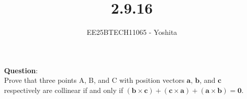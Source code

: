 \documentclass[journal]{IEEEtran}
\begin{document}

\vspace{3cm}

\title{2.9.16}
\author{EE25BTECH11065 - Yoshita}
{\let\newpage\relax\maketitle}

\renewcommand{\thefigure}{\theenumi}
\renewcommand{\thetable}{\theenumi}
\setlength{\intextsep}{10pt} %

\textbf{Question}:\\
Prove that three points A, B, and C with position vectors $\mathbf{a}$, $\mathbf{b}$, and $\mathbf{c}$ respectively are collinear if and only if $(\mathbf{b} \times \mathbf{c}) + (\mathbf{c} \times \mathbf{a}) + (\mathbf{a} \times \mathbf{b}) = \mathbf{0}$.\\
\bigskip
\end{document}
